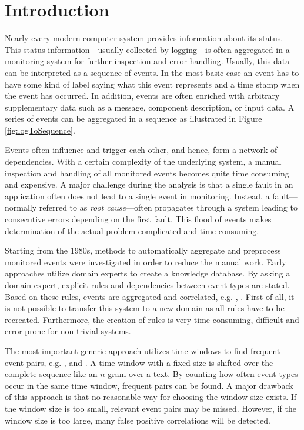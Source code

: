 \documentclass[conference]{IEEEtran}
\theoremstyle{examplestyle}
\begin{document}
\section{Introduction}
Nearly every modern computer system provides information about its status. This status information---usually collected by logging---is often aggregated in a monitoring system for further inspection and error handling. Usually, this data can be interpreted as a sequence of events. In the most basic case an event has to have some kind of label saying what this event represents and a time stamp when the event has occurred. In addition, events are often enriched with arbitrary supplementary data such as a message, component description, or input data. A series of events can be aggregated in a sequence as illustrated in Figure \ref{fig:logToSequence}.

Events often influence and trigger each other, and hence, form a network of dependencies. With a certain complexity of the underlying system, a manual inspection and handling of all monitored events becomes quite time consuming and expensive. A major challenge during the analysis is that a single fault in an application often does not lead to a single event in monitoring. Instead, a fault---normally referred to as \textit{root cause}---often propagates through a system leading to consecutive errors depending on the first fault. This flood of events makes determination of the actual problem complicated and time consuming.

Starting from the 1980s, methods to automatically aggregate and preprocess monitored events were investigated in order to reduce the manual work. Early approaches utilize domain experts to create a knowledge database. By asking a domain expert, explicit rules and dependencies between event types are stated. Based on these rules, events are aggregated and correlated, e.g. \cite{Houck1995}, \cite{Kettschau2002}. First of all, it is not possible to transfer this system to a new domain as all rules have to be recreated. Furthermore, the creation of rules is very time consuming, difficult and error prone for non-trivial systems.

The most important generic approach utilizes time windows to find frequent event pairs, e.g. \cite{Jakobson1993}, \cite{Mannila1997} and \cite{Bouandas2007}. A time window with a fixed size is shifted over the complete sequence like an \(n\)-gram over a text. By counting how often event types occur in the same time window, frequent pairs can be found. A major drawback of this approach is that no reasonable way for choosing the window size exists. If the window size is too small, relevant event pairs may be missed. However, if the window size is too large, many false positive correlations will be detected.
\end{document}
